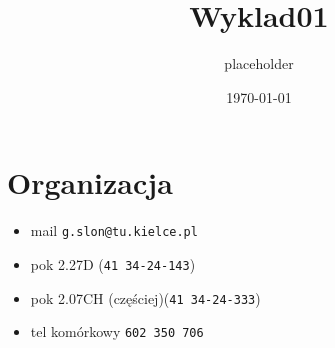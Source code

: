 \documentclass[11pt]{article}
\author{placeholder}
\date{\today}
\title{Wyklad01}
\begin{document}
\maketitle
\tableofcontents

\section{Organizacja}
\label{sec:org21dfded}
\begin{itemize}
\item mail \texttt{g.slon@tu.kielce.pl}
\item pok 2.27D (\texttt{41 34-24-143})
\item pok 2.07CH (częściej)(\texttt{41 34-24-333})
\item tel komórkowy \texttt{602 350 706}
\end{itemize}
\end{document}
